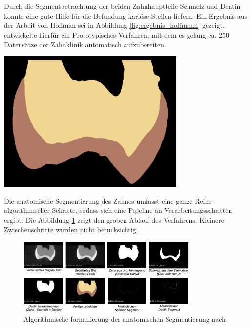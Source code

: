 \begin{minipage}{0.45\textwidth}
	Durch die Segmentbetrachtung der beiden Zahnhauptteile Schmelz und Dentin konnte
	\citet[S.~41]{hoffmann2020} eine gute Hilfe für die Befundung kariöse Stellen
	liefern. Ein Ergebnis aus der Arbeit von Hoffman sei in Abbildung \ref{fig:ergebnis_hoffmann}
	gezeigt. \citet[S.~53]{hoffmann2020} entwickelte hierfür ein Prototypisches Verfahren,
	mit dem es gelang ca. 250 Datensätze der Zahnklinik automatisch aufzubereiten.
\end{minipage}
\hfill
\begin{minipage}{0.45\textwidth}
	\centering
	\includegraphics[width=0.7\textwidth]{img/ergebnis_hoffmann_2.jpg}
	\label{fig:ergebnis_hoffmann}
\end{minipage}

Die anatomische Segmentierung des Zahnes umfasst eine ganze Reihe
algorithmischer Schritte, sodass sich eine Pipeline an Verarbeitungsschritten ergibt.
Die Abbildung \ref{fig:anatomische_segmentierung} zeigt den groben Ablauf des
Verfahrens. Kleinere Zwischenschritte wurden nicht berücksichtig.

\begin{figure}[h]
	\centering
	\includegraphics[width=0.8\textwidth]{img/anatomischeSegmentierung.png}
	\caption{Algorithmische formulierung der anatomischen Segmentierung nach
	\citet{hoffmann2020}}
	\label{fig:anatomische_segmentierung}
\end{figure}

